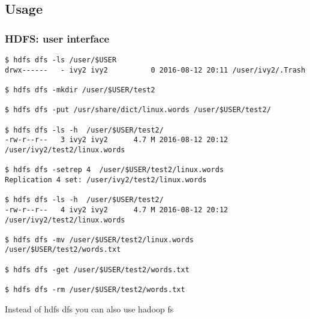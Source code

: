\documentclass{beamer}
\begin{document}
\subsection{Usage}
\begin{frame}[fragile]
  \frametitle{HDFS: user interface}
{\color{mycolorcli}
  \begin{lstlisting}[frame=single, basicstyle=\tiny]
$ hdfs dfs -ls /user/$USER
drwx------   - ivy2 ivy2          0 2016-08-12 20:11 /user/ivy2/.Trash                                                                                                                                                                     

$ hdfs dfs -mkdir /user/$USER/test2 

$ hdfs dfs -put /usr/share/dict/linux.words /user/$USER/test2/

$ hdfs dfs -ls -h  /user/$USER/test2/
-rw-r--r--   3 ivy2 ivy2      4.7 M 2016-08-12 20:12 /user/ivy2/test2/linux.words

$ hdfs dfs -setrep 4  /user/$USER/test2/linux.words
Replication 4 set: /user/ivy2/test2/linux.words

$ hdfs dfs -ls -h  /user/$USER/test2/
-rw-r--r--   4 ivy2 ivy2      4.7 M 2016-08-12 20:12 /user/ivy2/test2/linux.words

$ hdfs dfs -mv /user/$USER/test2/linux.words /user/$USER/test2/words.txt

$ hdfs dfs -get /user/$USER/test2/words.txt

$ hdfs dfs -rm /user/$USER/test2/words.txt
  \end{lstlisting}
}

Instead of {\color{mycolorcli}hdfs dfs} you can also use {\color{mycolorcli}hadoop fs}

\end{frame}
\end{document}
